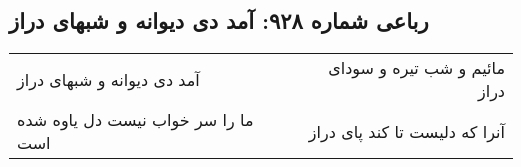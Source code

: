 \begin{center}
\section*{رباعی شماره ۹۲۸: آمد دی دیوانه و شبهای دراز}
\label{sec:0928}
\begin{longtable}{l p{0.5cm} r}
آمد دی دیوانه و شبهای دراز
&&
مائیم و شب تیره و سودای دراز
\\
ما را سر خواب نیست دل یاوه شده است
&&
آنرا که دلیست تا کند پای دراز
\\
\end{longtable}
\end{center}
